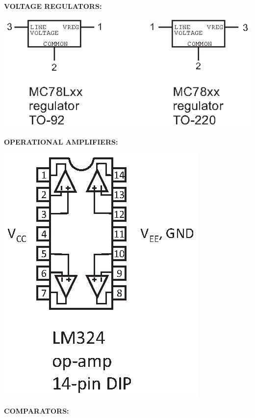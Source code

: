 \medskip
\textbf{VOLTAGE REGULATORS:}

\hspace{0.25in}\includegraphics{appendices/pinouts/regulator_pinouts.eps}

\medskip
\textbf{OPERATIONAL AMPLIFIERS:}

\hspace{0.25in}\includegraphics[scale=0.8]{appendices/pinouts/lm324.eps}

\bigskip %
\pagebreak

\textbf{COMPARATORS:}

